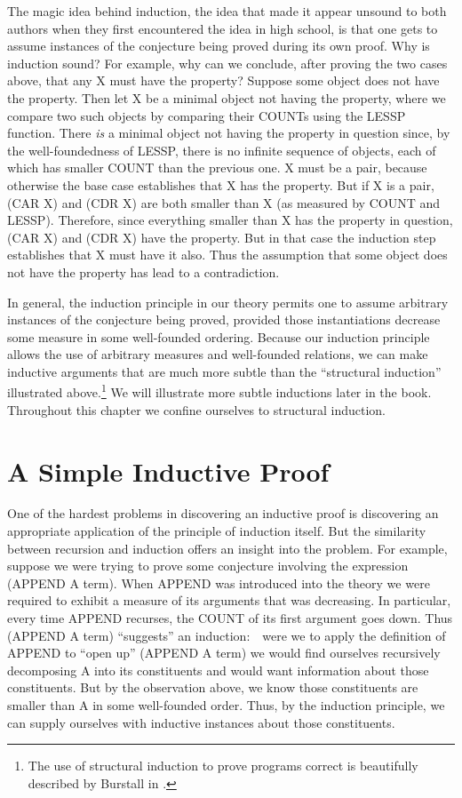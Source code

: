 \documentclass[10pt]{book}
\begin{document}
The magic idea behind induction, the idea that made it appear
unsound to both authors when they first encountered the idea
in high school, is that one gets to assume instances of
the conjecture being proved during its own proof.
Why is induction sound?
For example, why can we conclude, after proving the two cases above, that any
X must have the property?  Suppose some object does not have the property.
Then let X be a minimal object not having the property, where we
compare two such objects by comparing their COUNTs using the
LESSP function.
There \emph{is} a minimal object not having the property in question since,
by the well-foundedness of LESSP, there is no infinite sequence
of objects, each of which has smaller COUNT than the previous one.
X must be a pair, because otherwise the base case
establishes that X has the property.  But if X is a pair,
(CAR X) and (CDR X) are both smaller than X (as measured by
COUNT and LESSP).  Therefore, since everything smaller than X has
the property in question, (CAR X) and (CDR X) have the
property.  But in that case the induction step establishes that X must have it
also.  Thus the assumption that some object does not have the property
has lead to a contradiction.

In general, the induction principle in our theory permits one to assume
arbitrary instances of the conjecture being proved, provided those
instantiations decrease some measure in some well-founded
ordering.  Because our induction principle allows the use of arbitrary measures
and well-founded relations, we can make
inductive arguments that are much more subtle than the ``structural induction''
illustrated above.\footnote{The use of structural induction to prove programs correct is beautifully described by Burstall in \cite{BURSTALL}.}
We will illustrate more subtle inductions later in the book.
Throughout this chapter we confine ourselves to structural induction.

\section{A Simple Inductive Proof}
One of the hardest problems in discovering an inductive proof
is discovering an appropriate application of the principle of induction itself.  But the
similarity between recursion and induction offers an insight into
the problem.  For example, suppose we were trying to prove
some conjecture involving the expression (APPEND A term).
When APPEND was introduced
into the theory we were required to exhibit a measure of its
arguments that was decreasing.  In particular, every time APPEND
recurses, the COUNT of its first argument goes down.
Thus   (APPEND A term)  ``suggests'' an induction:~~were we to
apply the definition of APPEND to ``open up''
(APPEND A term) we would find ourselves recursively decomposing A into its
constituents and would want information about those constituents.
But by the observation above, we know those constituents
are smaller than A in some well-founded order.  Thus, by the induction
principle, we can supply ourselves with inductive instances about those
constituents.
\end{document}
